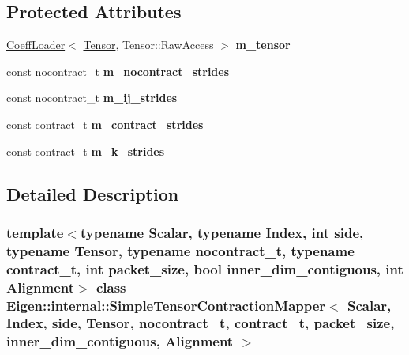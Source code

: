 \subsection*{Protected Attributes}
\begin{DoxyCompactItemize}
\item 
\mbox{\label{class_eigen_1_1internal_1_1_simple_tensor_contraction_mapper_aa8e71ee73fbce655a86ff42a039923f0}} 
\hyperlink{struct_eigen_1_1internal_1_1_coeff_loader}{Coeff\+Loader}$<$ \hyperlink{class_eigen_1_1_tensor}{Tensor}, Tensor\+::\+Raw\+Access $>$ {\bfseries m\+\_\+tensor}
\item 
\mbox{\label{class_eigen_1_1internal_1_1_simple_tensor_contraction_mapper_a7f3d5e22172390121ed92fa99957d422}} 
const nocontract\+\_\+t {\bfseries m\+\_\+nocontract\+\_\+strides}
\item 
\mbox{\label{class_eigen_1_1internal_1_1_simple_tensor_contraction_mapper_af95e80823a44f012fc232e9f9c183328}} 
const nocontract\+\_\+t {\bfseries m\+\_\+ij\+\_\+strides}
\item 
\mbox{\label{class_eigen_1_1internal_1_1_simple_tensor_contraction_mapper_ae5f78245d7039ba305a6cbcff973b006}} 
const contract\+\_\+t {\bfseries m\+\_\+contract\+\_\+strides}
\item 
\mbox{\label{class_eigen_1_1internal_1_1_simple_tensor_contraction_mapper_a78b975882d09747de53a61ca830c0b6c}} 
const contract\+\_\+t {\bfseries m\+\_\+k\+\_\+strides}
\end{DoxyCompactItemize}


\subsection{Detailed Description}
\subsubsection*{template$<$typename Scalar, typename Index, int side, typename Tensor, typename nocontract\+\_\+t, typename contract\+\_\+t, int packet\+\_\+size, bool inner\+\_\+dim\+\_\+contiguous, int Alignment$>$\newline
class Eigen\+::internal\+::\+Simple\+Tensor\+Contraction\+Mapper$<$ Scalar, Index, side, Tensor, nocontract\+\_\+t, contract\+\_\+t, packet\+\_\+size, inner\+\_\+dim\+\_\+contiguous, Alignment $>$}



